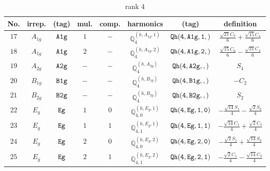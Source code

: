\documentclass[fleqn,8pt]{jsarticle}
\begin{document}
\begin{table}[ht!]
\begin{center}
\caption{rank 4}
\renewcommand{\arraystretch}{1.3}
\begin{tabular}{cccccccc} \hline \hline
No. & irrep. & (tag) & mul. & comp. & harmonics & (tag) & definition \\ \hline
$ 17 $ & $ A_{1g} $ & $ {\tt A1g} $ & $ 1 $ & $ - $ & $ \mathbb{Q}_{4}^{(h,A_{1g},1)} $ & $ {\tt Qh(4,A1g,1,)} $ & $ \frac{\sqrt{21} C_{0}}{6} + \frac{\sqrt{15} C_{4}}{6} $ \\
$ 18 $ & $ A_{1g} $ & $ {\tt A1g} $ & $ 2 $ & $ - $ & $ \mathbb{Q}_{4}^{(h,A_{1g},2)} $ & $ {\tt Qh(4,A1g,2,)} $ & $ \frac{\sqrt{15} C_{0}}{6} - \frac{\sqrt{21} C_{4}}{6} $ \\
$ 19 $ & $ A_{2g} $ & $ {\tt A2g} $ & $ - $ & $ - $ & $ \mathbb{Q}_{4}^{(h,A_{2g})} $ & $ {\tt Qh(4,A2g,,)} $ & $ S_{4} $ \\
$ 20 $ & $ B_{1g} $ & $ {\tt B1g} $ & $ - $ & $ - $ & $ \mathbb{Q}_{4}^{(h,B_{1g})} $ & $ {\tt Qh(4,B1g,,)} $ & $ - C_{2} $ \\
$ 21 $ & $ B_{2g} $ & $ {\tt B2g} $ & $ - $ & $ - $ & $ \mathbb{Q}_{4}^{(h,B_{2g})} $ & $ {\tt Qh(4,B2g,,)} $ & $ S_{2} $ \\
$ 22 $ & $ E_{g} $ & $ {\tt Eg} $ & $ 1 $ & $ 0 $ & $ \mathbb{Q}_{4,0}^{(h,E_{g},1)} $ & $ {\tt Qh(4,Eg,1,0)} $ & $ - \frac{\sqrt{14} S_{1}}{4} - \frac{\sqrt{2} S_{3}}{4} $ \\
$ 23 $ & $ E_{g} $ & $ {\tt Eg} $ & $ 1 $ & $ 1 $ & $ \mathbb{Q}_{4,1}^{(h,E_{g},1)} $ & $ {\tt Qh(4,Eg,1,1)} $ & $ - \frac{\sqrt{14} C_{1}}{4} + \frac{\sqrt{2} C_{3}}{4} $ \\
$ 24 $ & $ E_{g} $ & $ {\tt Eg} $ & $ 2 $ & $ 0 $ & $ \mathbb{Q}_{4,0}^{(h,E_{g},2)} $ & $ {\tt Qh(4,Eg,2,0)} $ & $ - \frac{\sqrt{2} S_{1}}{4} + \frac{\sqrt{14} S_{3}}{4} $ \\
$ 25 $ & $ E_{g} $ & $ {\tt Eg} $ & $ 2 $ & $ 1 $ & $ \mathbb{Q}_{4,1}^{(h,E_{g},2)} $ & $ {\tt Qh(4,Eg,2,1)} $ & $ - \frac{\sqrt{2} C_{1}}{4} - \frac{\sqrt{14} C_{3}}{4} $ \\
 \hline \hline
\end{tabular}
\end{center}
\end{table}
\end{document}

